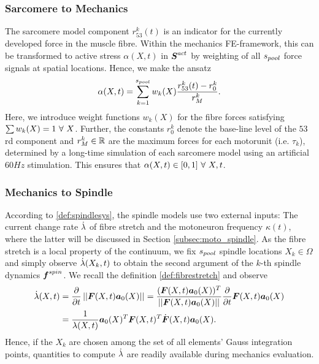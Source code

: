 \subsubsection{Sarcomere to Mechanics}
The sarcomere model component $r_{53}^k(t)$ is an indicator for the currently developed force in the muscle fibre.
Within the mechanics FE-framework, this can be transformed to active stress $\alpha(X,t)$ in $\boldsymbol{S}^{act}$ by weighting of all ${s_{pool}}$ force signals at spatial locations.
Hence, we make the ansatz
\begin{align}
	\alpha(X,t) = \sum\limits_{k=1}^{s_{pool}} w_k(X)\frac{r^k_{53}(t)-r^k_0}{r^k_M}.\label{def:alpha}
\end{align}
Here, we introduce weight functions $w_k(X)$ for the fibre forces satisfying $\sum w_k(X) = 1 ~\forall~ X$.
Further, the constants $r_0^k$ denote the base-line level of the $53$rd component and
$r^k_M\in\mathbb{R}$ are the maximum forces for each motorunit (i.e. $\tau_k$), determined by a long-time simulation of each sarcomere model using an
artificial $60Hz$ stimulation.
This ensures that $\alpha(X,t) \in [0,1] ~\forall~ X,t$. 

\subsubsection{Mechanics to Spindle}
According to \ref{def:spindlesys}, the spindle models use two external inputs:
The current change rate $\dot{\lambda}$ of fibre stretch and the motoneuron frequency $\kappa(t)$, where the latter will be discussed in Section
\ref{subsec:moto_spindle}.
As the fibre stretch is a local property of the continuum, we fix ${s_{pool}}$ spindle locations $X_k\in\Omega$ and simply observe $\dot{\lambda}(X_k,t)$ to obtain the second
argument of the $k$-th spindle dynamics $\boldsymbol{f}^{spin}$.
We recall the definition \eqref{def:fibrestretch} and observe 
\begin{align}
	\dot{\lambda}(X,t) &= \frac{\partial }{\partial t}\left|\left|\boldsymbol{F}(X,t)\boldsymbol{a}_0(X)\right|\right|_{} = \frac{(\boldsymbol{F}(X,t)\boldsymbol{a}_0(X))^T}{\left|\left|\boldsymbol{F}(X,t)\boldsymbol{a}_0(X)\right|\right|_{}}\frac{\partial }{\partial t}\boldsymbol{F}(X,t)\boldsymbol{a}_0(X)\nonumber\\
	  &= \frac{1}{\lambda(X,t)}\boldsymbol{a}_0(X)^T\boldsymbol{F}(X,t)^T\dot{\boldsymbol{F}}(X,t)\boldsymbol{a}_0(X).\label{eq:dlambda}
\end{align}
Hence, if the $X_k$ are chosen among the set of all elements' Gauss integration points, quantities to compute $\dot{\lambda}$ are readily available during mechanics evaluation.

